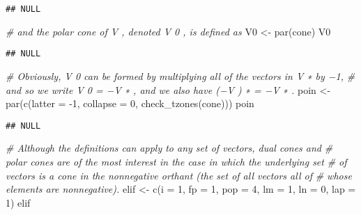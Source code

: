 \documentclass[
]{article}
\newenvironment{Shaded}{\begin{snugshade}}{\end{snugshade}}
\newcommand{\AttributeTok}[1]{\textcolor[rgb]{0.77,0.63,0.00}{#1}}
\newcommand{\CommentTok}[1]{\textcolor[rgb]{0.56,0.35,0.01}{\textit{#1}}}
\newcommand{\DecValTok}[1]{\textcolor[rgb]{0.00,0.00,0.81}{#1}}
\newcommand{\FunctionTok}[1]{\textcolor[rgb]{0.00,0.00,0.00}{#1}}
\newcommand{\NormalTok}[1]{#1}
\newcommand{\OtherTok}[1]{\textcolor[rgb]{0.56,0.35,0.01}{#1}}
\newcommand{\SpecialCharTok}[1]{\textcolor[rgb]{0.00,0.00,0.00}{#1}}
\begin{document}
\begin{verbatim}
## NULL
\end{verbatim}

\begin{Shaded}
\begin{Highlighting}[]
\CommentTok{\# and the polar cone of V , denoted V 0 , is defined as}
\NormalTok{V0 }\OtherTok{\textless{}{-}} \FunctionTok{par}\NormalTok{(cone)}
\NormalTok{V0}
\end{Highlighting}
\end{Shaded}

\begin{verbatim}
## NULL
\end{verbatim}

\begin{Shaded}
\begin{Highlighting}[]
\CommentTok{\# Obviously, V 0 can be formed by multiplying all of the vectors in V ∗ by −1,}
\CommentTok{\# and so we write V 0 = −V ∗ , and we also have (−V ) ∗ = −V ∗ .}
\NormalTok{poin }\OtherTok{\textless{}{-}} \FunctionTok{par}\NormalTok{(}\FunctionTok{c}\NormalTok{(}\AttributeTok{latter =} \SpecialCharTok{{-}}\DecValTok{1}\NormalTok{, }\AttributeTok{collapse =} \DecValTok{0}\NormalTok{, }\FunctionTok{check\_tzones}\NormalTok{(cone)))}
\NormalTok{poin}
\end{Highlighting}
\end{Shaded}

\begin{verbatim}
## NULL
\end{verbatim}

\begin{Shaded}
\begin{Highlighting}[]
\CommentTok{\# Although the definitions can apply to any set of vectors, dual cones and}
\CommentTok{\# polar cones are of the most interest in the case in which the underlying set}
\CommentTok{\# of vectors is a cone in the nonnegative orthant (the set of all vectors all of}
\CommentTok{\# whose elements are nonnegative).}
\NormalTok{elif }\OtherTok{\textless{}{-}} \FunctionTok{c}\NormalTok{(}\AttributeTok{i =} \DecValTok{1}\NormalTok{, }\AttributeTok{fp =} \DecValTok{1}\NormalTok{, }\AttributeTok{pop =} \DecValTok{4}\NormalTok{, }\AttributeTok{lm =} \DecValTok{1}\NormalTok{, }\AttributeTok{ln =} \DecValTok{0}\NormalTok{, }\AttributeTok{lap =} \DecValTok{1}\NormalTok{)}
\NormalTok{elif}
\end{Highlighting}
\end{Shaded}
\end{document}
